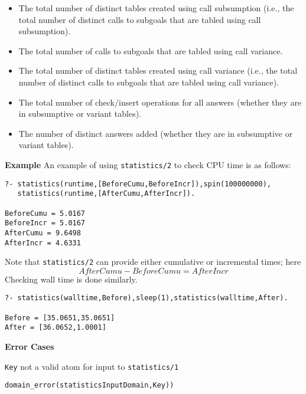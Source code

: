 \begin{description}
\begin{itemize}
\item The total number of distinct tables created using call
 subsumption (i.e., the total number of distinct calls to subgoals
 that are tabled using call subsumption).

\item The total number of calls to subgoals that are
 tabled using call variance.

\item The total number of distinct tables created using call
 variance (i.e., the total number of distinct calls to subgoals
 that are tabled using call variance).

\item The total number of check/insert operations for all answers
 (whether they are in subsumptive or variant tables).

\item The number of distinct answers added (whether they are in
 subsumptive or variant tables).
\end{itemize}
%
\ei

{\bf Example}
An example of using {\tt statistics/2} to check CPU time is as follows:

\begin{verbatim}
?- statistics(runtime,[BeforeCumu,BeforeIncr]),spin(100000000),
   statistics(runtime,[AfterCumu,AfterIncr]).

BeforeCumu = 5.0167
BeforeIncr = 5.0167
AfterCumu = 9.6498
AfterIncr = 4.6331
\end{verbatim}
Note that {\tt statistics/2} can provide either cumulative or
 incremental times; here
\[
 AfterCumu - BeforeCumu = AfterIncr
\]
Checking wall time is done similarly.
\begin{verbatim}
?- statistics(walltime,Before),sleep(1),statistics(walltime,After).

Before = [35.0651,35.0651]
After = [36.0652,1.0001]
\end{verbatim}

{\bf Error Cases}
\bi
\item {\tt Key} not a valid atom for input to {\tt statistics/1} 
\bi
\item 	{\tt domain\_error(statisticsInputDomain,Key))}
\ei
\ei
{}
\end{description}
